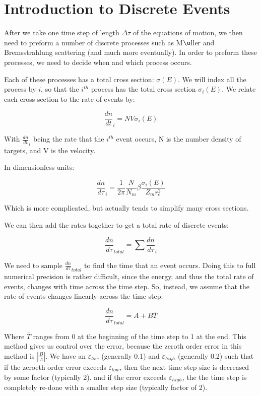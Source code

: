 \documentclass[]{article}
\begin{document}
\section{Introduction to Discrete Events}

After we take one time step of length $\Delta \tau$ of the equations of motion, we then need to preform a number of discrete processes such as M$\o$ller and Bremsstrahlung scattering (and much more eventually). In order to preform these processes, we need to decide when and which process occurs. 

Each of these processes has a total cross section: $\sigma(E)$. We will index all the process by $i$, so that the $i^{th}$ process has the total cross section $\sigma_i(E)$. We relate each cross section to the rate of events by:

\begin{equation}
\frac{dn}{dt}_i = N V \sigma_i(E)
\end{equation}

With $\frac{dn}{dt}_i$ being the rate that the $i^{th}$ event occurs, N is the number density of targets, and V is the velocity.

In dimensionless units:

\begin{equation}
\frac{dn}{d\tau}_{i} = \frac{1}{2 \pi} \frac{N}{N_m} \beta \frac{\sigma_i(E)}{Z_mr_e^2}
\end{equation}

Which is more complicated, but actually tends to simplify many cross sections.

We can then add the rates together to get a total rate of discrete events:

\begin{equation}
\frac{dn}{d\tau}_{total} = \sum \frac{dn}{d\tau}_{i}
\end{equation}

We need to sample $\frac{dn}{d\tau}_{total}$ to find the time that an event occurs. Doing this to full numerical precision is rather difficult, since the energy, and thus the total rate of events, changes with time across the time step. So, instead, we assume that the rate of events changes linearly across the time step:

\begin{equation}
\frac{dn}{d\tau}_{total} = A + B\bar{T}
\end{equation}

Where $\bar{T}$ ranges from 0 at the beginning of the time step to 1 at the end. This method gives us control over the error, because the zeroth order error in this method is $\left| \frac{B}{A} \right| $. We have an $ \varepsilon_{low}$ (generally 0.1) and $ \varepsilon_{high}$ (generally 0.2) such that if the zeroeth order error exceeds $ \varepsilon_{low}$, then the next time step size is decreased by some factor (typically 2). and if the error exceeds  $ \varepsilon_{high}$, the the time step is completely re-done with a smaller step size (typically factor of 2). 
\end{document}

